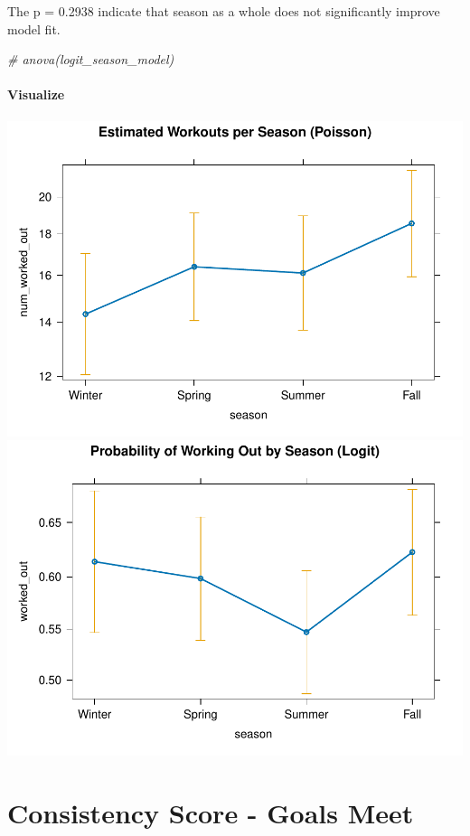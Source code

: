 \documentclass[
  11pt,
]{article}
\newenvironment{Shaded}{\begin{snugshade}}{\end{snugshade}}
\newcommand{\CommentTok}[1]{\textcolor[rgb]{0.56,0.35,0.01}{\textit{#1}}}
\begin{document}
The p = 0.2938 indicate that season as a whole does not significantly
improve model fit.

\begin{Shaded}
\begin{Highlighting}[]
\CommentTok{\# anova(logit\_season\_model)}
\end{Highlighting}
\end{Shaded}

\paragraph{Visualize}\label{visualize}

\includegraphics{analysis_files/figure-latex/unnamed-chunk-21-1.pdf}
\includegraphics{analysis_files/figure-latex/unnamed-chunk-21-2.pdf}

\section{Consistency Score - Goals
Meet}\label{consistency-score---goals-meet}
\end{document}
